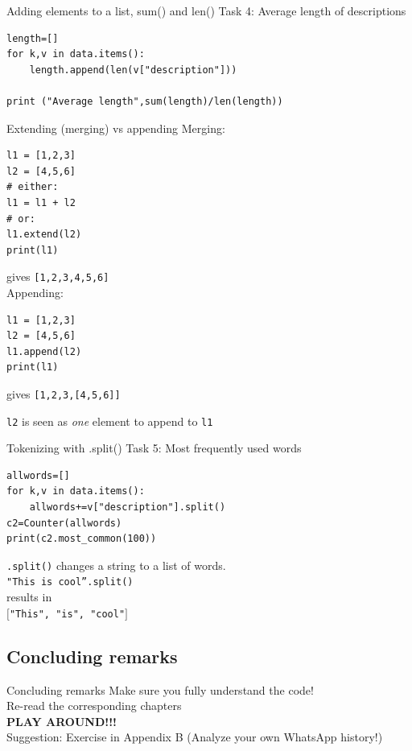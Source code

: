\documentclass{beamer}
\begin{document}
\begin{frame}[fragile]{Adding elements to a list, sum() and len()}
Task 4: Average length of descriptions
\begin{lstlisting}
length=[]
for k,v in data.items():
    length.append(len(v["description"]))
    
print ("Average length",sum(length)/len(length))
\end{lstlisting}

\end{frame}


\begin{frame}[fragile]{Extending (merging) vs appending}
Merging:
\begin{lstlisting}
l1 = [1,2,3]
l2 = [4,5,6]
# either:
l1 = l1 + l2
# or:
l1.extend(l2)
print(l1)
\end{lstlisting}
gives \texttt{[1,2,3,4,5,6]}
~\\

Appending:
\begin{lstlisting}
l1 = [1,2,3]
l2 = [4,5,6]
l1.append(l2)
print(l1)
\end{lstlisting}
gives \texttt{[1,2,3,[4,5,6]]}

\texttt{l2} is seen as \emph{one} element to append to \texttt{l1}
\end{frame}


\begin{frame}[fragile]{Tokenizing with .split()}
Task 5: Most frequently used words
\begin{lstlisting}
allwords=[]
for k,v in data.items():
    allwords+=v["description"].split()
c2=Counter(allwords)
print(c2.most_common(100))
\end{lstlisting}
\scriptsize{
\texttt{.split()} changes a string to a list of words.\\ \texttt{"This is cool''.split()} \\results in\\ \texttt{$[$"This", "is", "cool"$]$}\\
}
\end{frame}


\subsection{Concluding remarks}
\begin{frame}{Concluding remarks}
Make sure you fully understand the code!\\
\vspace{1cm}
Re-read the corresponding chapters\\
\vspace{1cm}
\textbf{PLAY AROUND!!!}\\

Suggestion: Exercise in Appendix B (Analyze your own WhatsApp history!)
\end{frame}
\end{document}
